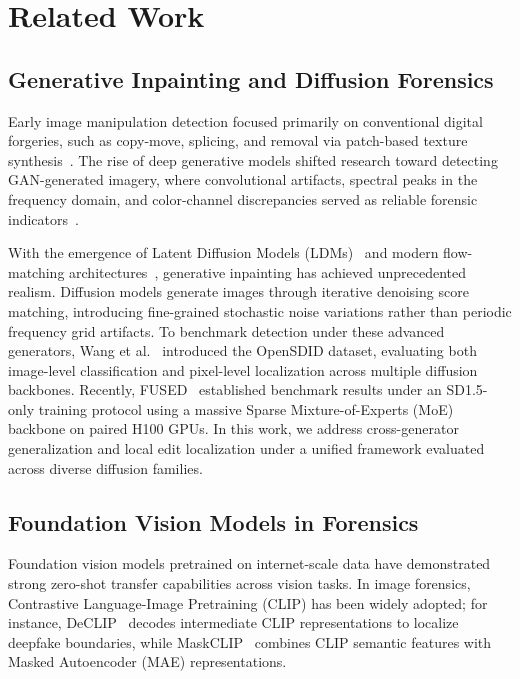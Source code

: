 \section{Related Work}
\label{sec:related}

\subsection{Generative Inpainting and Diffusion Forensics}
Early image manipulation detection focused primarily on conventional digital forgeries, such as copy-move, splicing, and removal via patch-based texture synthesis~\cite{mvss,pscc}. The rise of deep generative models shifted research toward detecting GAN-generated imagery, where convolutional artifacts, spectral peaks in the frequency domain, and color-channel discrepancies served as reliable forensic indicators~\cite{cnndet,npr}. 

With the emergence of Latent Diffusion Models (LDMs)~\cite{ldm} and modern flow-matching architectures~\cite{flux}, generative inpainting has achieved unprecedented realism. Diffusion models generate images through iterative denoising score matching, introducing fine-grained stochastic noise variations rather than periodic frequency grid artifacts. To benchmark detection under these advanced generators, Wang et al.~\cite{opensdi} introduced the OpenSDID dataset, evaluating both image-level classification and pixel-level localization across multiple diffusion backbones. Recently, FUSED~\cite{fused} established benchmark results under an SD1.5-only training protocol using a massive Sparse Mixture-of-Experts (MoE) backbone on paired H100 GPUs. In this work, we address cross-generator generalization and local edit localization under a unified framework evaluated across diverse diffusion families.

\subsection{Foundation Vision Models in Forensics}
Foundation vision models pretrained on internet-scale data have demonstrated strong zero-shot transfer capabilities across vision tasks. In image forensics, Contrastive Language-Image Pretraining (CLIP) has been widely adopted; for instance, DeCLIP~\cite{declip} decodes intermediate CLIP representations to localize deepfake boundaries, while MaskCLIP~\cite{opensdi} combines CLIP semantic features with Masked Autoencoder (MAE) representations. 

